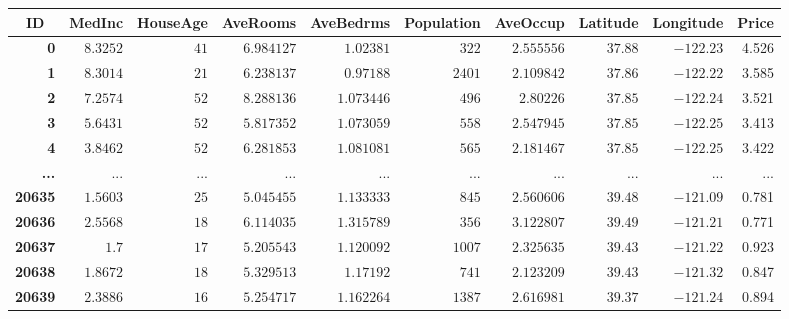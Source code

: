 {%
  \makeatletter
    \DeclareRobustCommand\myvdots{%
      \vbox{%
        \baselineskip4\p@%
        \lineskiplimit\z@%
        \vspace{3pt}\hbox{.}\hbox{.}\hbox{.}%
      }%
    }
  \makeatother
  \begin{tabular}{|r|r|r|r|r|r|r|r|r|r|}
    \hline
      \multicolumn{1}{|c|}{\textbf{ID}} & \multicolumn{1}{c|}{\textbf{MedInc}} & \multicolumn{1}{c|}{\textbf{HouseAge}} & \multicolumn{1}{c|}{\textbf{AveRooms}} & \multicolumn{1}{c|}{\textbf{AveBedrms}} & \multicolumn{1}{c|}{\textbf{Population}} & \multicolumn{1}{c|}{\textbf{AveOccup}} & \multicolumn{1}{c|}{\textbf{Latitude}} & \multicolumn{1}{c|}{\textbf{Longitude}} & \multicolumn{1}{c|}{\textbf{Price}} \\
    \hline
      \textbf{0} & $8.3252$ & $41$ & $6.984127$ & $1.02381$ & $322$ & $2.555556$ & $37.88$ & $-122.23$ & 4.526 \\
    \cline{1-1}
      \textbf{1} & $8.3014$ & $21$ & $6.238137$ & $0.97188$ & $2401$ & $2.109842$ & $37.86$ & $-122.22$ & 3.585 \\
    \cline{1-1}
      \textbf{2} & $7.2574$ & $52$ & $8.288136$ & $1.073446$ & $496$ & $2.80226$ & $37.85$ & $-122.24$ & 3.521 \\
    \cline{1-1}
      \textbf{3} & $5.6431$ & $52$ & $5.817352$ & $1.073059$ & $558$ & $2.547945$ & $37.85$ & $-122.25$ & 3.413 \\
    \cline{1-1}
      \textbf{4} & $3.8462$ & $52$ & $6.281853$ & $1.081081$ & $565$ & $2.181467$ & $37.85$ & $-122.25$ & 3.422 \\
    \hline
      \textbf{\myvdots\hspace{.125em}} & \myvdots\hspace{.25em} & \myvdots\hspace{.25em} & \myvdots\hspace{.25em} & \myvdots\hspace{.25em} & \myvdots\hspace{.25em} & \myvdots\hspace{.25em} & \myvdots\hspace{.25em} & \myvdots\hspace{.25em} & \myvdots\hspace{.25em} \\
    \hline
    \textbf{20635} & $1.5603$ & $25$ & $5.045455$ & $1.133333$ & $845$ & $2.560606$ & $39.48$ & $-121.09$ & 0.781 \\
    \cline{1-1}
    \textbf{20636} & $2.5568$ & $18$ & $6.114035$ & $1.315789$ & $356$ & $3.122807$ & $39.49$ & $-121.21$ & 0.771 \\
    \cline{1-1}
    \textbf{20637} & $1.7$ & $17$ & $5.205543$ & $1.120092$ & $1007$ & $2.325635$ & $39.43$ & $-121.22$ & 0.923 \\
    \cline{1-1}
    \textbf{20638} & $1.8672$ & $18$ & $5.329513$ & $1.17192$ & $741$ & $2.123209$ & $39.43$ & $-121.32$ & 0.847 \\
    \cline{1-1}
    \textbf{20639} & $2.3886$ & $16$ & $5.254717$ & $1.162264$ & $1387$ & $2.616981$ & $39.37$ & $-121.24$ & 0.894 \\
    \hline
  \end{tabular}%
}
